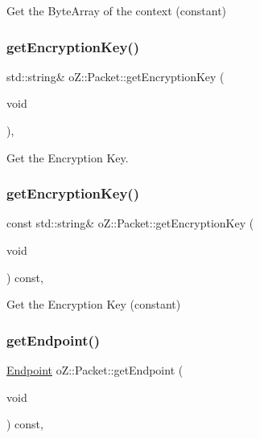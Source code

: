 Get the Byte\+Array of the context (constant) 

\mbox{\label{classo_z_1_1_packet_a93abca1901de8784297e53e2a92dc810}} 
\subsubsection{\texorpdfstring{getEncryptionKey()}{getEncryptionKey()}\hspace{0.1cm}{\footnotesize\ttfamily [1/2]}}
{\footnotesize\ttfamily std\+::string\& o\+Z\+::\+Packet\+::get\+Encryption\+Key (\begin{DoxyParamCaption}\item[{void}]{ }\end{DoxyParamCaption})\hspace{0.3cm}{\ttfamily [inline]}, {\ttfamily [noexcept]}}



Get the Encryption Key. 

\mbox{\label{classo_z_1_1_packet_a71f6029e78232544fd48761de456719a}} 
\subsubsection{\texorpdfstring{getEncryptionKey()}{getEncryptionKey()}\hspace{0.1cm}{\footnotesize\ttfamily [2/2]}}
{\footnotesize\ttfamily const std\+::string\& o\+Z\+::\+Packet\+::get\+Encryption\+Key (\begin{DoxyParamCaption}\item[{void}]{ }\end{DoxyParamCaption}) const\hspace{0.3cm}{\ttfamily [inline]}, {\ttfamily [noexcept]}}



Get the Encryption Key (constant) 

\mbox{\label{classo_z_1_1_packet_a89367cc491fdfdb6bf88eda9bc4eb219}} 
\subsubsection{\texorpdfstring{getEndpoint()}{getEndpoint()}}
{\footnotesize\ttfamily \mbox{\hyperlink{classo_z_1_1_endpoint}{Endpoint}} o\+Z\+::\+Packet\+::get\+Endpoint (\begin{DoxyParamCaption}\item[{void}]{ }\end{DoxyParamCaption}) const\hspace{0.3cm}{\ttfamily [inline]}, {\ttfamily [noexcept]}}



